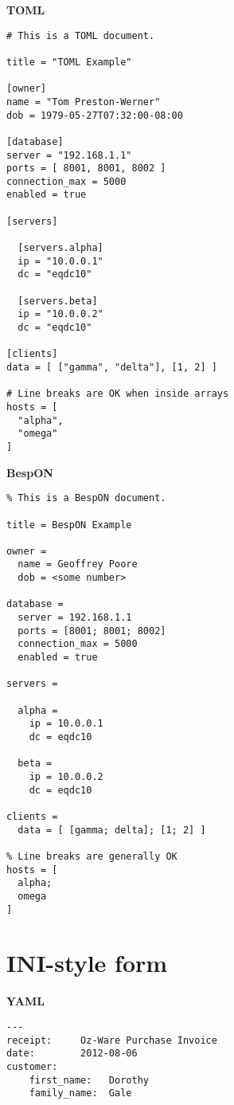 \documentclass[11pt]{article}
\begin{document}
{{\begin{appendices}
\begin{tcolorbox}{}
\begin{multicols}{2}
\centering \textbf{TOML}
\begin{Verbatim}[formatcom=\color{DarkGreen}]
# This is a TOML document.

title = "TOML Example"

[owner]
name = "Tom Preston-Werner"
dob = 1979-05-27T07:32:00-08:00

[database]
server = "192.168.1.1"
ports = [ 8001, 8001, 8002 ]
connection_max = 5000
enabled = true

[servers]

  [servers.alpha]
  ip = "10.0.0.1"
  dc = "eqdc10"

  [servers.beta]
  ip = "10.0.0.2"
  dc = "eqdc10"

[clients]
data = [ ["gamma", "delta"], [1, 2] ]

# Line breaks are OK when inside arrays
hosts = [
  "alpha",
  "omega"
]
\end{Verbatim}
\columnbreak
\centering \textbf{BespON}

\begin{Verbatim}
% This is a BespON document.

title = BespON Example

owner =
  name = Geoffrey Poore
  dob = <some number>

database =
  server = 192.168.1.1
  ports = [8001; 8001; 8002]
  connection_max = 5000
  enabled = true

servers =

  alpha = 
    ip = 10.0.0.1
    dc = eqdc10

  beta =
    ip = 10.0.0.2
    dc = eqdc10

clients =
  data = [ [gamma; delta]; [1; 2] ]

% Line breaks are generally OK
hosts = [
  alpha;
  omega
]
\end{Verbatim}
\end{multicols}
\end{tcolorbox}



\section{INI-style form}




\begin{tcolorbox}{}
\begin{multicols}{2}

\centering \textbf{YAML}
\begin{Verbatim}[formatcom=\color{DarkGreen}]
---
receipt:     Oz-Ware Purchase Invoice
date:        2012-08-06
customer:
    first_name:   Dorothy
    family_name:  Gale


\end{Verbatim}
\end{multicols}
\end{tcolorbox}
\end{appendices}}}
\end{document}
